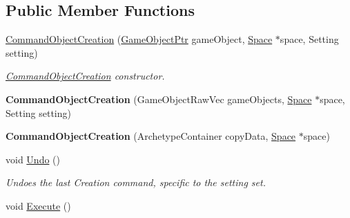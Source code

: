 \subsection*{Public Member Functions}
\begin{DoxyCompactItemize}
\item 
\hypertarget{classDCEngine_1_1CommandObjectCreation_aa6e8e01f3ea70b2257a319a7465e4839}{\hyperlink{classDCEngine_1_1CommandObjectCreation_aa6e8e01f3ea70b2257a319a7465e4839}{Command\-Object\-Creation} (\hyperlink{classDCEngine_1_1GameObject}{Game\-Object\-Ptr} game\-Object, \hyperlink{classDCEngine_1_1Space}{Space} $\ast$space, Setting setting)}\label{classDCEngine_1_1CommandObjectCreation_aa6e8e01f3ea70b2257a319a7465e4839}

\begin{DoxyCompactList}\small\item\em \hyperlink{classDCEngine_1_1CommandObjectCreation}{Command\-Object\-Creation} constructor. \end{DoxyCompactList}\item 
\hypertarget{classDCEngine_1_1CommandObjectCreation_a31ab1c485ccf5b416b1bf92f53d5521f}{{\bfseries Command\-Object\-Creation} (Game\-Object\-Raw\-Vec game\-Objects, \hyperlink{classDCEngine_1_1Space}{Space} $\ast$space, Setting setting)}\label{classDCEngine_1_1CommandObjectCreation_a31ab1c485ccf5b416b1bf92f53d5521f}

\item 
\hypertarget{classDCEngine_1_1CommandObjectCreation_a485481332df600dca540bcd11594be63}{{\bfseries Command\-Object\-Creation} (Archetype\-Container copy\-Data, \hyperlink{classDCEngine_1_1Space}{Space} $\ast$space)}\label{classDCEngine_1_1CommandObjectCreation_a485481332df600dca540bcd11594be63}

\item 
\hypertarget{classDCEngine_1_1CommandObjectCreation_af0a957acc7f80c247f26ea8421e5eb2f}{void \hyperlink{classDCEngine_1_1CommandObjectCreation_af0a957acc7f80c247f26ea8421e5eb2f}{Undo} ()}\label{classDCEngine_1_1CommandObjectCreation_af0a957acc7f80c247f26ea8421e5eb2f}

\begin{DoxyCompactList}\small\item\em Undoes the last Creation command, specific to the setting set. \end{DoxyCompactList}\item 
\hypertarget{classDCEngine_1_1CommandObjectCreation_aea823e7c160e8a09fb393459d7e2ff5d}{void \hyperlink{classDCEngine_1_1CommandObjectCreation_aea823e7c160e8a09fb393459d7e2ff5d}{Execute} ()}\label{classDCEngine_1_1CommandObjectCreation_aea823e7c160e8a09fb393459d7e2ff5d}


\end{DoxyCompactItemize}
